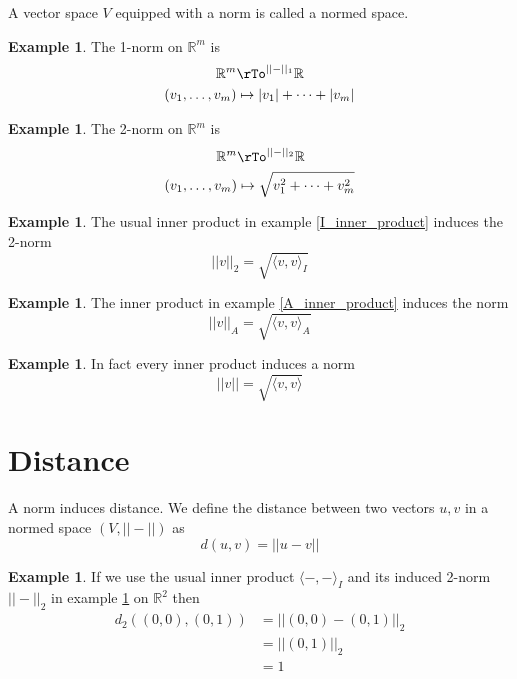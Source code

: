 \documentclass[12pt]{amsart}
\theoremstyle{definition}
\newtheorem{example}[theorem]{Example}
\begin{document}
A vector space $V$ equipped with a norm is called a normed space.
\vfill
\pagebreak

\begin{example} \label{1_norm} The 1-norm on $\mathbb{R}^m$ is
\begin{align*}
\mathbb{R}^m & \rTo^{||-||_1} \mathbb{R} \\
(v_1, \dots , v_m) & \mapsto |v_1| + \dots + |v_m|
\end{align*}
\end{example}
\vspace{30pt}

\begin{example} \label{2_norm} The 2-norm on $\mathbb{R}^m$ is
\begin{align*}
\mathbb{R}^m & \rTo^{||-||_2} \mathbb{R} \\
(v_1, \dots , v_m) & \mapsto \sqrt{v_1^2 + \dots + v_m^2}
\end{align*}
\end{example}
\vspace{30pt}

\begin{example} \label{I_inner_product_induces_2_norm} The usual inner product in example \ref{I_inner_product} induces the 2-norm
$$||v||_2 = \sqrt{\langle v, v \rangle_I}$$
\end{example}
\vspace{30pt}

\begin{example} \label{A_inner_product_induces_A_norm} The inner product in example \ref{A_inner_product} induces the norm
$$||v||_A = \sqrt{\langle v, v \rangle_A}$$
\end{example}
\vspace{30pt}

\begin{example} \label{inner_product_induces_norm} In fact every inner product induces a norm
$$||v|| = \sqrt{\langle v, v \rangle}$$
\end{example}
\vfill
\pagebreak

\section{Distance} A norm induces distance.
\dfn We define the distance between two vectors $u, v$ in a normed space $(V, ||-||)$ as
$$d(u, v) = ||u - v||$$
\vfill
\pagebreak

\begin{example} If we use the usual inner product $\langle -,- \rangle_I$ and its induced 2-norm $||-||_2$ in example \ref{I_inner_product_induces_2_norm} on $\mathbb{R}^2$ then
\begin{align*}
d_2 ((0, 0), (0, 1)) & = ||(0, 0) - (0, 1)||_2 \\
 & = ||(0, 1)||_2 \\
 & = 1
\end{align*}
\end{example}
\vspace{30pt}
\end{document}
